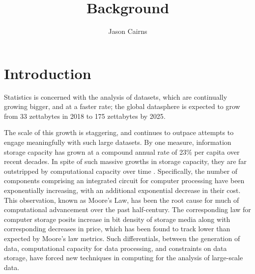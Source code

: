 \documentclass[a4paper,10pt]{article}
\begin{document}
\title{Background}
\author{Jason Cairns}
  
\maketitle

\section{Introduction}
Statistics is concerned with the analysis of datasets, which are continually growing bigger, and at a faster rate; the global datasphere is expected to grow from 33 zettabytes in 2018 to 175 zettabytes by 2025\cite{rydning2018digitization}.

The scale of this growth is staggering, and continues to outpace attempts to engage meaningfully with such large datasets. By one measure, information storage capacity has grown at a compound annual rate of 23\% per capita over recent decades\cite{hilbert2011world}.
In spite of such massive growths in storage capacity, they are far outstripped by computational capacity over time \cite{fontana2018moore}.
Specifically, the number of components comprising an integrated circuit for computer processing have been exponentially increasing, with an additional exponential decrease in their cost\cite{moore1975progress}.
This observation, known as Moore's Law, has been the root cause for much of computational advancement over the past half-century.
The corresponding law for computer storage posits increase in bit density of storage media along with corresponding decreases in price, which has been found to track lower than expected by Moore's law metrics.
Such differentials, between the generation of data, computational capacity for data processing, and constraints on data storage, have forced new techniques in computing for the analysis of large-scale data.
\end{document}
